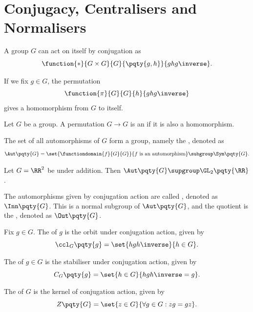 \section{Conjugacy, Centralisers and Normalisers}

A group \(G\) can act on itself by conjugation as
\[
    \function{\ast}{G \times G}{G}{\pqty{g, h}}{g h g\inverse}.
\]

\begin{lemma}
    \label{lem:conjugation-element-homomorphism-self}%
    If we fix \(g \in G\), the permutation
    \[
        \function{\pi}{G}{G}{h}{ghg\inverse}
    \]
    gives a homomorphism from \(G\) to itself.
\end{lemma}

\begin{definition}
    \label{def:automorphism}%
    Let \(G\) be a group. A permutation \(G \to G\) is an  if it is also a homomorphism.

    The set of all automorphisms of \(G\) form a group, namely the , denoted as
    \[
        \Aut\pqty{G} = \set{\functiondomain{f}{G}{G}}{f \text{ is an automorphism}} \subgroup \Sym\pqty{G}.
    \]
\end{definition}

\begin{example*}
    Let \(G = \RR^2\) be under addition. Then \(\Aut\pqty{G} \supgroup \GL_2\pqty{\RR}\).
\end{example*}

\begin{notation}
    The automorphisms given by conjugation action are called , denoted as \(\Inn\pqty{G}\). This is a normal subgroup of \(\Aut\pqty{G}\), and the quotient is the , denoted as \(\Out\pqty{G}\).
\end{notation}

\begin{definition}
    \label{def:ccl-centraliser-centre}%
    Fix \(g \in G\). The  of \(g\) is the orbit under conjugation action, given by
    \[
        \ccl_G\pqty{g} = \set{hgh\inverse}{h \in G}.
    \]

    The  of \(g \in G\) is the stabiliser under conjugation action, given by
    \[
        C_G\pqty{g} = \set{h \in G}{h g h\inverse = g}.
    \]

    The  of \(G\) is the kernel of conjugation action, given by
    \[
        Z\pqty{G} = \set{z \in G}{\forall g \in G: zg = gz}.
    \]
\end{definition}

